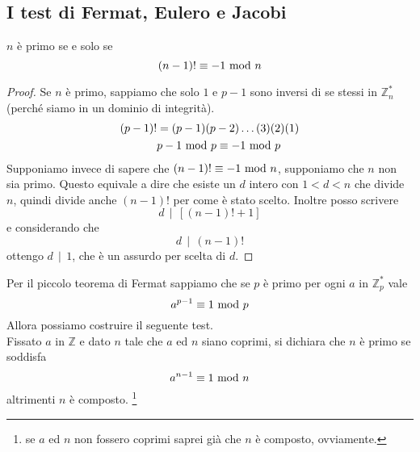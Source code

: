 \subsection{I test di Fermat, Eulero e Jacobi}
\begin{teorema}
	$n$ è primo se e solo se 
	\begin{equation*}
	(n-1)!\equiv-1\ \mathrm{mod}\ n
	\end{equation*}
\end{teorema}
\begin{proof}
	Se $n$ è primo, sappiamo che solo $1$ e $p-1$ sono inversi di se stessi in $\mathbb{Z}_n^*$ (perché siamo in un dominio di integrità).
	\begin{align*}
	(p-1)!&=(p-1)(p-2)\dots(3)(2)(1)\\
	&p-1\ \mathrm{mod}\ p\equiv -1\ \mathrm{mod}\ p
	\end{align*}
	Supponiamo invece di sapere che $(n-1)!\equiv-1\ \mathrm{mod}\ n$, supponiamo che $n$ non sia primo. Questo equivale a dire che esiste un $d$ intero con $1<d<n$ che divide $n$, quindi divide anche $(n-1)!$ per come è stato scelto. Inoltre posso scrivere
	\begin{equation*}
	d \, \mid \, [(n-1)!+1]
	\end{equation*}
	e considerando che 
	\begin{equation*}
	d \, \mid \, (n-1)!
	\end{equation*}
	ottengo $d \, \mid \, 1$, che è un assurdo per scelta di $d$.
\end{proof}
\begin{teorema}
	Per il piccolo teorema di Fermat sappiamo che se $p$ è primo per ogni $a$ in $\mathbb{Z}_p^*$ vale 
	\begin{equation*}
	a^{p-1}\equiv1\ \mathrm{mod}\ p
	\end{equation*}
	Allora possiamo costruire il seguente test. \\ Fissato $a$ in $\mathbb{Z}$ e dato $n$ tale che $a$ ed $n$ siano coprimi, si dichiara che $n$ è primo se soddisfa 
	\begin{equation*}
	a^{n-1}\equiv1\ \mathrm{mod}\ n
	\end{equation*}
	altrimenti $n$ è composto. \footnote{se $a$ ed $n$ non fossero coprimi saprei già che $n$ è composto, ovviamente.}
\end{teorema}
